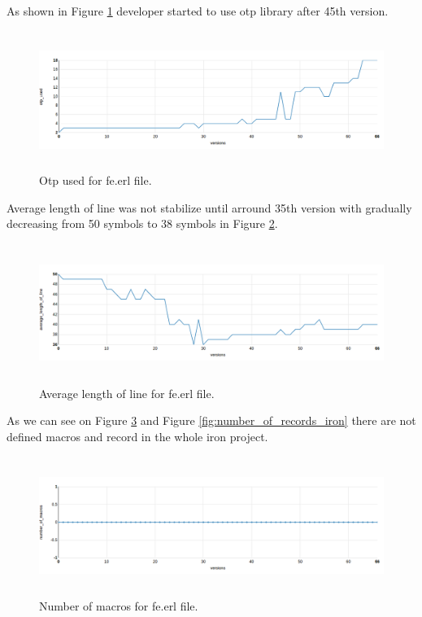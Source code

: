 As shown in Figure \ref{fig:otp_iron} developer started to use otp library after 45th version. 

\begin{figure}[h]
	\centering
	\includegraphics[height=45mm]{figures/otp_iron.png}
	\caption{Otp used for fe.erl file.}
	\label{fig:otp_iron}
\end{figure}

Average length of line was not stabilize until arround 35th version with gradually decreasing from 50 symbols to 38 symbols in Figure \ref{fig:average_length_of_line_iron}.

\begin{figure}[h]
	\centering
	\includegraphics[height=45mm]{figures/average_length_of_line_iron.png}
	\caption{Average length of line for fe.erl file.}
	\label{fig:average_length_of_line_iron}
\end{figure}

As we can see on Figure \ref{fig:number_of_macros_iron} and Figure \ref{fig:number_of_records_iron} there are not defined macros and record in the whole iron project.

\begin{figure}[h]
	\centering
	\includegraphics[height=45mm]{figures/number_of_macros_iron.png}
	\caption{Number of macros for fe.erl file.}
	\label{fig:number_of_macros_iron}
\end{figure}


